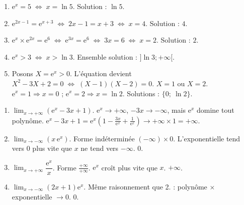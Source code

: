 \documentclass[11pt]{article}
\begin{document}
\begin{corrige}
\begin{enumerate}
\item $\mathrm{e}^{x}=5 \;\Leftrightarrow\; x = \ln 5$. \quad Solution : $\boxed{\ln 5}$.
\item $\mathrm{e}^{2x-1}=\mathrm{e}^{x+3} \;\Leftrightarrow\; 2x-1 = x+3 \;\Leftrightarrow\; x = 4$. \quad Solution : $\boxed{4}$.
\item $\mathrm{e}^{x}\times \mathrm{e}^{2x}=\mathrm{e}^{6} \;\Leftrightarrow\; \mathrm{e}^{3x}=\mathrm{e}^{6} \;\Leftrightarrow\; 3x=6 \;\Leftrightarrow\; x=2$. \quad Solution : $\boxed{2}$.
\item $\mathrm{e}^{x}>3 \;\Leftrightarrow\; x > \ln 3$. \quad Ensemble solution : $\boxed{]\ln 3; +\infty[}$.
\item Posons $X=\mathrm{e}^{x} > 0$. L'équation devient $X^{2}-3X+2=0 \;\Leftrightarrow\; (X-1)(X-2)=0$.
  $X=1$ ou $X=2$.
  $\mathrm{e}^{x}=1 \Rightarrow x=0$ ; $\mathrm{e}^{x}=2 \Rightarrow x=\ln 2$.
  Solutions : $\boxed{\{0;\ \ln 2\}}$.
\end{enumerate}
\end{corrige}

\begin{corrige}
\begin{enumerate}
\item $\displaystyle\lim_{x\to +\infty}\left(\mathrm{e}^{x}-3x+1\right)$.
  $\mathrm{e}^{x} \to +\infty$, $-3x \to -\infty$, mais $\mathrm{e}^{x}$ domine tout polynôme.
  $\mathrm{e}^{x}-3x+1 = \mathrm{e}^{x}\left(1 - \frac{3x}{\mathrm{e}^{x}} + \frac{1}{\mathrm{e}^{x}}\right) \to +\infty \times 1 = \boxed{+\infty}$.
\item $\displaystyle\lim_{x\to -\infty}\left(x\,\mathrm{e}^{x}\right)$.
  Forme indéterminée $(-\infty)\times 0$. L'exponentielle tend vers $0$ plus vite que $x$ ne tend vers $-\infty$.
  $\boxed{0}$.
\item $\displaystyle\lim_{x\to +\infty}\dfrac{\mathrm{e}^{x}}{x}$.
  Forme $\frac{+\infty}{+\infty}$. $\mathrm{e}^{x}$ croît plus vite que $x$.
  $\boxed{+\infty}$.
\item $\displaystyle\lim_{x\to -\infty}\left(2x+1\right)\mathrm{e}^{x}$.
  Même raisonnement que 2. : polynôme $\times$ exponentielle $\to 0$.
  $\boxed{0}$.
\end{enumerate}
\end{corrige}
\end{document}
